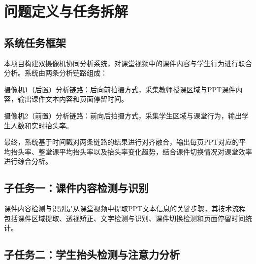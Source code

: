 \documentclass[12pt,hyperref,a4paper,UTF8]{ctexart}
\begin{document}
\section{问题定义与任务拆解}

\subsection{系统任务框架}

本项目构建双摄像机协同分析系统，对课堂视频中的课件内容与学生行为进行联合分析。系统由两条分析链路组成：

摄像机1（后置）分析链路：后向前拍摄方式，采集教师授课区域与PPT课件内容，输出课件文本内容和页面停留时间。

摄像机2（前置）分析链路：前向后拍摄方式，采集学生区域与课堂行为，输出学生人数和实时抬头率。

最终，系统基于时间戳对两条链路的结果进行对齐融合，输出每页PPT对应的平均抬头率、整堂课平均抬头率以及抬头率变化趋势，结合课件切换情况对课堂效率进行综合分析。

\subsection{子任务一：课件内容检测与识别}

课件内容检测与识别是从课堂视频中提取PPT文本信息的关键步骤，其技术流程包括课件区域提取、透视矫正、文字检测与识别、课件切换检测和页面停留时间统计。




\subsection{子任务二：学生抬头检测与注意力分析}
\end{document}
